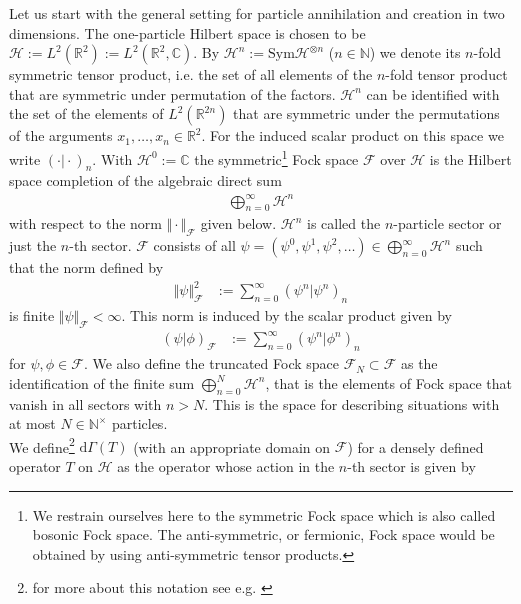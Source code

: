Let us start with the general setting for particle annihilation and creation in two dimensions. The one-particle Hilbert space is chosen to be $\mathcal{H} := L^{2}(\mathbb{R}^{2}) := L^{2}(\mathbb{R}^{2},\mathbb{C})$. By $\mathcal{H}^{n} := \mathrm{Sym}\mathcal{H}^{\otimes n}$ ($n \in \mathbb{N}$) we denote its $n$-fold symmetric tensor product, i.e. the set of all elements of the $n$-fold tensor product that are symmetric under permutation of the factors. $\mathcal{H}^{n}$ can be identified with the set of the elements of $L^{2}(\mathbb{R}^{2n})$ that are symmetric under the permutations of the arguments $x_{1},\dots,x_{n} \in \mathbb{R}^{2}$. For the induced scalar product on this space we write $(\cdot \vert \cdot)_{n}$. With $\mathcal{H}^{0} := \mathbb{C}$ the symmetric\footnote{We restrain ourselves here to the symmetric Fock space which is also called bosonic Fock space. The anti-symmetric, or fermionic, Fock space would be obtained by using anti-symmetric tensor products.} Fock space $\mathcal{F}$ over $\mathcal{H}$ is the Hilbert space completion of the algebraic direct sum
\begin{align*}
  \bigoplus_{n = 0}^{\infty}
  \mathcal{H}^{n}
\end{align*}
with respect to the norm $\Vert \cdot \Vert_{\mathcal{F}}$ given below. $\mathcal{H}^{n}$ is called the $n$-particle sector or just the $n$-th sector. $\mathcal{F}$ consists of all $\psi = (\psi^{0},\psi^{1},\psi^{2},\dots) \in \bigoplus_{n = 0}^{\infty}\mathcal{H}^{n}$ such that the norm defined by
\begin{align*}
  \Vert \psi \Vert_{\mathcal{F}}^{2}
  &:=
  \sum_{n = 0}^{\infty}
  \left(
      \psi^{n}
    \vert
      \psi^{n}
  \right)_{n}
\end{align*}
is finite $\Vert \psi \Vert_{\mathcal{F}} < \infty$. This norm is induced by the scalar product given by
\begin{align*}
  \left(
      \psi
    \vert
      \phi
  \right)_{\mathcal{F}}
  &:=
  \sum_{n = 0}^{\infty}
  \left(
      \psi^{n}
    \vert
      \phi^{n}
  \right)_{n}
\end{align*}
for $\psi,\phi \in \mathcal{F}$. We also define the truncated Fock space $\mathcal{F}_{N} \subset \mathcal{F}$ as the identification of the finite sum $\bigoplus_{n = 0}^{N}\mathcal{H}^{n}$, that is the elements of Fock space that vanish in all sectors with $n > N$. This is the space for describing situations with at most $N \in \mathbb{N}^{\times}$ particles.
\\
We define\footnote{for more about this notation see e.g. \cite{7f9f7f95}} $\mathrm{d}\Gamma(T)$ (with an appropriate domain on $\mathcal{F}$) for a densely defined operator $T$ on $\mathcal{H}$ as the operator whose action in the $n$-th sector is given by
